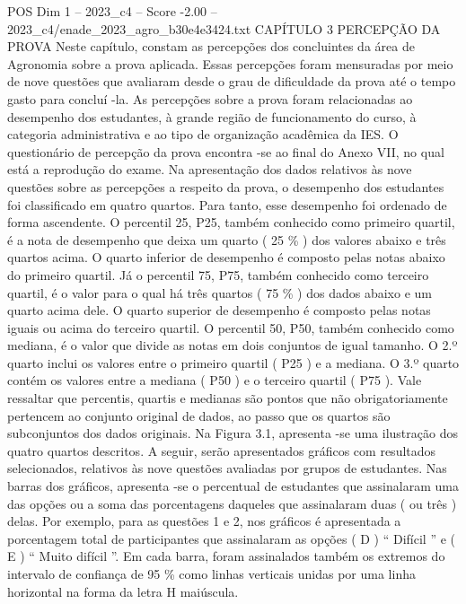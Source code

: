 \begin{textsample}{POS Dim 1 – 2023\_c4 – Score -2.00 – 2023\_c4/enade\_2023\_agro\_b30e4e3424.txt}  \label{ex:f1_pos_194}
CAPÍTULO 3 PERCEPÇÃO DA PROVA Neste capítulo, constam as percepções dos concluintes da área de Agronomia sobre a prova aplicada.
Essas percepções foram mensuradas por meio de nove questões que avaliaram desde o grau de dificuldade da prova até o tempo gasto para concluí -la.
As percepções sobre a prova foram relacionadas ao desempenho dos estudantes, à grande região de funcionamento do curso, à categoria administrativa e ao tipo de organização acadêmica da IES.
O questionário de percepção da prova encontra -se ao final do Anexo VII, no qual está a reprodução do exame.
Na apresentação dos dados relativos às nove questões sobre as percepções a respeito da prova, o desempenho dos estudantes foi classificado em quatro quartos.
Para tanto, esse desempenho foi ordenado de forma ascendente.
O percentil 25, P25, também conhecido como primeiro quartil, é a nota de desempenho que deixa um quarto ( 25 \% ) dos valores abaixo e três quartos acima.
O quarto inferior de desempenho é composto pelas notas abaixo do primeiro quartil.
Já o percentil 75, P75, também conhecido como terceiro quartil, é o valor para o qual há três quartos ( 75 \% ) dos dados abaixo e um quarto acima dele.
O quarto superior de desempenho é composto pelas notas iguais ou acima do terceiro quartil.
O percentil 50, P50, também conhecido como mediana, é o valor que divide as notas em dois conjuntos de igual tamanho.
O 2.º quarto inclui os valores entre o primeiro quartil ( P25 ) e a mediana.
O 3.º quarto contém os valores entre a mediana ( P50 ) e o terceiro quartil ( P75 ).
Vale ressaltar que percentis, quartis e medianas são pontos que não obrigatoriamente pertencem ao conjunto original de dados, ao passo que os quartos são subconjuntos dos dados originais.
Na Figura 3.1, apresenta -se uma ilustração dos quatro quartos descritos.
A seguir, serão apresentados gráficos com resultados selecionados, relativos às nove questões avaliadas por grupos de estudantes.
Nas barras dos gráficos, apresenta -se o percentual de estudantes que assinalaram uma das opções ou a soma das porcentagens daqueles que assinalaram duas ( ou três ) delas.
Por exemplo, para as questões 1 e 2, nos gráficos é apresentada a porcentagem total de participantes que assinalaram as opções ( D ) “ Difícil ” e ( E ) “ Muito difícil ”.
Em cada barra, foram assinalados também os extremos do intervalo de confiança de 95 \% como linhas verticais unidas por uma linha horizontal na forma da letra H maiúscula.

\end{textsample}
